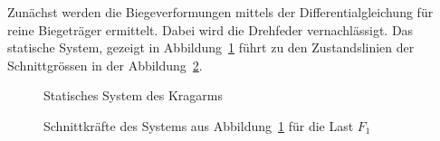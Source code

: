 \documentclass[
  11pt,
  letterpaper,
]{scrreprt}
\begin{document}
Zunächst werden die Biegeverformungen mittels der Differentialgleichung
für reine Biegeträger ermittelt. Dabei wird die Drehfeder
vernachlässigt. Das statische System, gezeigt in
Abbildung~\ref{fig-kragarm-sys} führt zu den Zustandslinien der
Schnittgrössen in der Abbildung~\ref{fig-skkragarmreal}.

\begin{figure}[H]


\caption{\label{fig-kragarm-sys}Statisches System des Kragarms}

\end{figure}%

\begin{figure}[H]


\caption{\label{fig-skkragarmreal}Schnittkräfte des Systems aus
Abbildung~\ref{fig-kragarm-sys} für die Last \(F_1\)}

\end{figure}%
\end{document}
